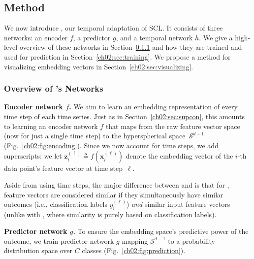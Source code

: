\subsection{Method}

We now introduce , our temporal adaptation of SCL.
It consists of three networks: an encoder $f$, a predictor $g$, and a temporal network $h$. 
We give a high-level overview of these networks in Section~\ref{ch02:sec:overview-networks} and how they are trained and used for prediction in Section~\ref{ch02:sec:training}.
We propose a method for visualizing embedding vectors in Section~\ref{ch02:sec:visualizing}.



\subsubsection{Overview of 's Networks}
\label{ch02:sec:overview-networks}

 

\noindent
\textbf{Encoder network $f$.}
We aim to learn an embedding representation of every time step of each time series. 
Just as in Section~\ref{ch02:sec:supcon}, this amounts to learning an encoder network $f$ that maps from the raw feature vector space (now for just a single time step) to the hyperspherical space~$\mathcal{S}^{d-1}$ (Fig.~\ref{ch02:fig:encoding}).
Since we now account for time steps, we add superscripts: we let $\mathbf{z}_i^{(\ell)}\triangleq f(\mathbf{x}_i^{(\ell)})$ denote the embedding vector of the \mbox{$i$-th}  data point's feature vector at time step~$\ell$. 

Aside from using time steps, the major difference between  and  is that for , feature vectors are considered similar if they simultaneously have similar outcomes (i.e., classification labels $y_i^{(\ell)}$) \emph{and} similar input feature vectors (unlike with , where similarity is purely based on classification labels).


\noindent
\textbf{Predictor network $g$.}
To ensure the embedding space's predictive power of the outcome, we train predictor network $g$ mapping $\mathcal{S}^{d-1}$ to a probability distribution space over $C$ classes (Fig.~\ref{ch02:fig:prediction}).


